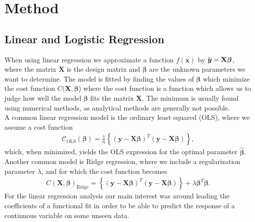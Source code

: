\documentclass[english,notitlepage,reprint,nofootinbib]{revtex4-2}  %
\begin{document}
\section{Method}\label{sec:methods}

\subsection*{Linear and Logistic Regression}
When using linear regression we approximate a function $f(\boldsymbol{x})$ by $\Tilde{\boldsymbol{y}} = \mathbf{X}\boldsymbol{\beta}$, where the matrix $\mathbf{X}$ is the design matrix and $\boldsymbol{\beta}$ are the unknown parameters we want to determine. 
The model is fitted by finding the values of $\boldsymbol{\beta}$ which minimize the cost function $C(\mathbf{X}, \boldsymbol{\beta}$) where the cost function is a function which allows us to judge how well the model $\boldsymbol{\beta}$ fits the matrix $\mathbf{X}$. The minimum is usually found using numerical methods, as analytical methods are generally not possible. 
\vspace{3mm}
\\
A common linear regression model is the ordinary least squared (OLS), where we assume a cost function 
\begin{align}\label{eq: costfunc_OLS}
    \mathcal{C}_\text{OLS}(\boldsymbol{\beta}) = \frac{1}{n}\left\{(\boldsymbol{y} - \mathbf{X}\boldsymbol{\beta})^T (\boldsymbol{y} - \mathbf{X}\boldsymbol{\beta})\right\},
\end{align}
which, when minimized, yields the OLS expression for the optimal parameter $\hat{\boldsymbol{\beta}}$. 
Another common model is Ridge regression, where we include a regularization parameter $\lambda$, and for which the cost function becomes 
\begin{align}\label{eq: costfunc_ridge}
    C(\mathbf{X},\boldsymbol{\beta})_\text{Ridge} = \left\{ (\boldsymbol{y} - \mathbf{X}\boldsymbol{\beta})^T (\boldsymbol{y} - \mathbf{X}\boldsymbol{\beta}) \right\} + \lambda\boldsymbol{\beta}^T\boldsymbol{\beta}. 
\end{align}
For the linear regression analysis our main interest was around leading the coefficients of a functional fit in order to be able to predict the response of a continuous variable on some unseen data. 
\end{document}
